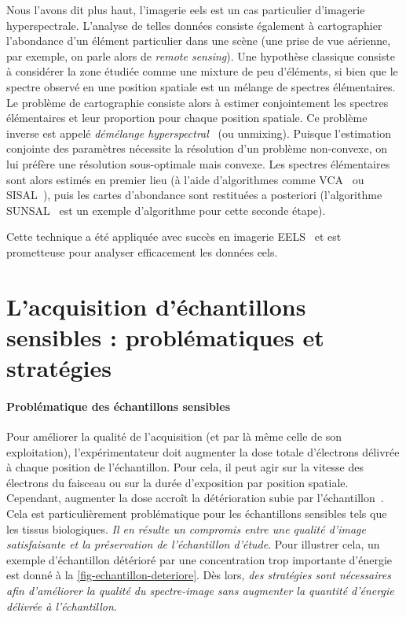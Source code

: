     Nous l'avons dit plus haut, l'imagerie \gls{eels} est un cas particulier d'imagerie hyperspectrale. L'analyse de telles données consiste également à cartographier l'abondance d'un élément particulier dans une scène (une prise de vue aérienne, par exemple, on parle alors de \emph{remote sensing}). Une hypothèse classique consiste à considérer la zone étudiée comme une mixture de peu d'éléments, si bien que le spectre observé en une position spatiale est un mélange de spectres élémentaires. Le problème de cartographie consiste alors à estimer conjointement les spectres élémentaires et leur proportion pour chaque position spatiale. Ce problème inverse est appelé \emph{démélange hyperspectral}~\cite{bioucas2012hyperspectral} (ou unmixing). Puisque l'estimation conjointe des paramètres nécessite la résolution d'un problème non-convexe, on lui préfère une résolution sous-optimale mais convexe. Les spectres élémentaires sont alors estimés en premier lieu (à l'aide d'algorithmes comme VCA~\cite{nascimento2005vertex} ou SISAL~\cite{bioucas2009variable}), puis les cartes d'abondance sont restituées a posteriori (l'algorithme SUNSAL~\cite{bioucas2010alternating} est un exemple d'algorithme pour cette seconde étape).

    Cette technique a été appliquée avec succès en imagerie EELS~\cite{dobigeon2012spectral, Dobigeon_ELSEVIER_2016} et est prometteuse pour analyser efficacement les données \gls{eels}.


    \section{L'acquisition d'échantillons sensibles : problématiques et stratégies}\label{sec-ech-sensibles}

    \paragraph{Problématique des échantillons sensibles} Pour améliorer la qualité de l'acquisition (et par là même celle de son exploitation), l'expérimentateur doit augmenter la dose totale d'électrons délivrée à chaque position de l'échantillon. Pour cela, il peut agir sur la vitesse des électrons du faisceau ou sur la durée d'exposition par position spatiale. Cependant, augmenter la dose accroît la détérioration subie par l'échantillon~\cite{egerton2004radiation}. Cela est particulièrement problématique pour les échantillons sensibles tels que les tissus biologiques. \emph{Il en résulte un compromis entre une qualité d'image satisfaisante et la préservation de l'échantillon d'étude}. Pour illustrer cela, un exemple d'échantillon détérioré par une concentration trop importante d'énergie est donné à la \cref{fig-echantillon-deteriore}. Dès lors, \emph{des stratégies sont nécessaires afin d'améliorer la qualité du spectre-image sans augmenter la quantité d'énergie délivrée à l'échantillon}.

